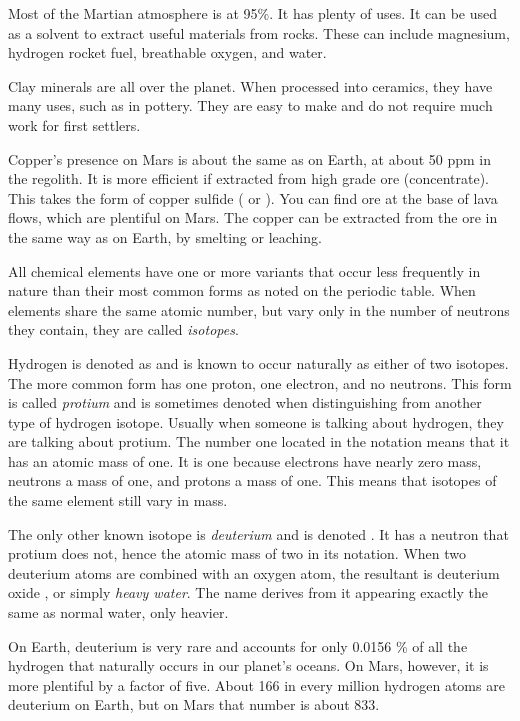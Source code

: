 Most of the Martian atmosphere is  at 95\%. It has plenty of uses. It can be used as a solvent to extract useful materials from rocks. These can include magnesium, hydrogen rocket fuel, breathable oxygen, and water.

Clay minerals are all over the planet. When processed into ceramics, they have many uses, such as in pottery. They are easy to make and do not require much work for first settlers.

Copper's presence on Mars is about the same as on Earth, at about 50 ppm in the regolith. It is more efficient if extracted from high grade ore (concentrate). This takes the form of copper sulfide ( or ). You can find ore at the base of lava flows, which are plentiful on Mars. The copper can be extracted from the ore in the same way as on Earth, by smelting or leaching.

All chemical elements have one or more variants that occur less frequently in nature than their most common forms as noted on the periodic table. When elements share the same atomic number, but vary only in the number of neutrons they contain, they are called {\it isotopes}.

Hydrogen is denoted as  and is known to occur naturally as either of two isotopes. The more common form has one proton, one electron, and no neutrons. This form is called {\it protium} and is sometimes denoted  when distinguishing from another type of hydrogen isotope. Usually when someone is talking about hydrogen, they are talking about protium. The number one located in the notation means that it has an atomic mass of one. It is one because electrons have nearly zero mass, neutrons a mass of one, and protons a mass of one. This means that isotopes of the same element still vary in mass.

The only other known isotope is {\it deuterium} and is denoted . It has a neutron that protium does not, hence the atomic mass of two in its notation. When two deuterium atoms are combined with an oxygen atom, the resultant is deuterium oxide , or simply {\it heavy water}. The name derives from it appearing exactly the same as normal water, only heavier.

On Earth, deuterium is very rare and accounts for only 0.0156 \% of all the hydrogen that naturally occurs in our planet's oceans. On Mars, however, it is more plentiful by a factor of five. About 166 in every million hydrogen atoms are deuterium on Earth, but on Mars that number is about 833. 

